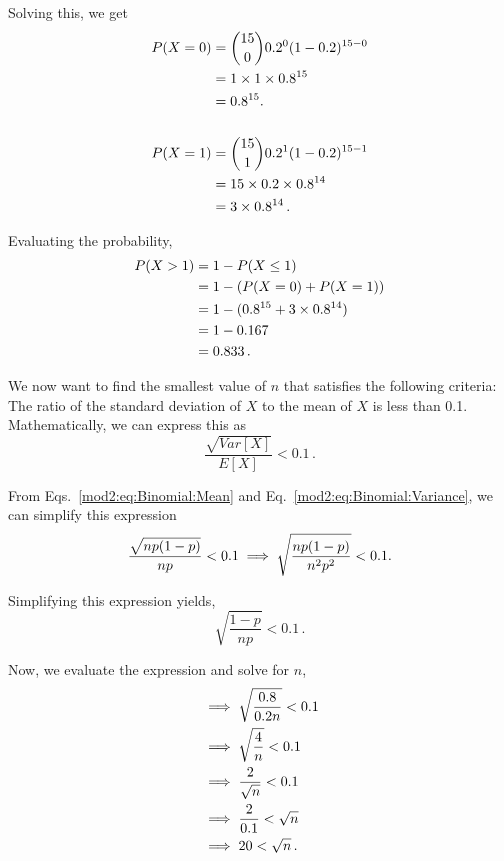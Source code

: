 \begin{subquestions}
\begin{subsubquestions}
   Solving this, we get
   \begin{align}
   	P(X=0)&={ 15 \choose 0} 0.2^0 (1-0.2)^{15-0} \nonumber \\
   	&=1\times1\times0.8^{15} \nonumber \\
   	&=0.8^{15}.\nonumber \\ \nonumber \\
   	P(X=1)&={ 15 \choose 1} 0.2^1 (1-0.2)^{15-1} \nonumber \\
   	&=15 \times 0.2 \times 0.8^{14} \nonumber \\
   	&=3\times 0.8^{14} \,. 
   \end{align}

   Evaluating the probability,
   \begin{align}
   	P(X>1)&=1-P(X\leq1) \nonumber \\
   	&=1-(P(X=0)+P(X=1)) \nonumber \\
   	&=1-(0.8^{15}+3\times0.8^{14}) \nonumber \\
   	&=1- 0.167 \nonumber \\
   	&=0.833 \, .
   \end{align}

   \subsubquestion

   We now want to find the smallest value of $n$ that satisfies the following criteria: \\The ratio of the standard deviation of $X$ to the mean of $X$ is less than 0.1.\\

   Mathematically, we can express this as
   \begin{equation}
   	\frac{\sqrt{Var[X]}}{E[X]}< 0.1 \,. 
   \end{equation}

   From Eqs.~\ref{mod2:eq:Binomial:Mean} and Eq.~\ref{mod2:eq:Binomial:Variance}, we can simplify this expression
   \begin{equation}
   	\frac{\sqrt{np(1-p)}}{np}<0.1 \implies \sqrt{\frac{np(1-p)}{n^2p^2}}<0.1.  \\ 
   \end{equation}

   Simplifying this expression yields,
   \begin{equation}
   	\sqrt{\frac{1-p}{np}}<0.1 \, .
   \end{equation}

   Now, we evaluate the expression and solve for $n$,
   \begin{align}
   		&\implies \sqrt{\frac{0.8}{0.2n}}<0.1 \nonumber \\
   		&\implies \sqrt{\frac{4}{n}}<0.1 \nonumber \\
   		&\implies \frac{2}{\sqrt{n}}<0.1 \nonumber \\
   		&\implies \frac{2}{0.1}<\sqrt{n} \nonumber \\
   		&\implies 20<\sqrt{n}\, . 
   \end{align}


\end{subsubquestions}
\end{subquestions}
